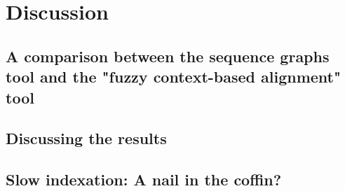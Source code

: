 \documentclass[thesis.tex]{subfiles}
\begin{document}
\chapter{Discussion}
\section{A comparison between the sequence graphs tool and the "fuzzy context-based alignment" tool}
\section{Discussing the results}
\section{Slow indexation: A nail in the coffin?}
\end{document}
